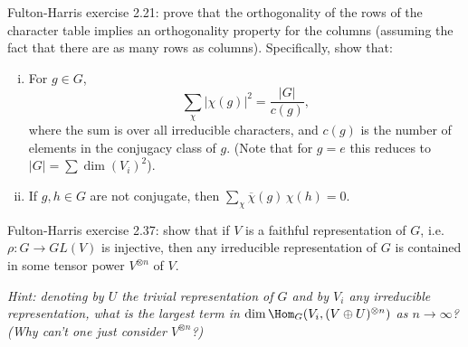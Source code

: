 \documentclass[11pt,letterpaper]{article}
\begin{document}
\pagebreak
\begin{problem}
    Fulton-Harris exercise 2.21: prove that the orthogonality of the rows of the character table implies an orthogonality property for the columns (assuming the fact that there are as many rows as columns).  Specifically, show that:
    \begin{enumerate}[(i)]
        \item For $g\in G$, $$\sum\limits_\chi |\chi(g)|^2=\dfrac{|G|}{c(g)},$$ where the sum is over all irreducible characters, and $c(g)$ is the number of elements in the conjugacy class of $g$. (Note that for $g=e$ this reduces to $|G|=\sum \dim(V_i)^2$).
        \item If $g,h\in G$ are not conjugate, then $\sum\limits_\chi \overline{\chi}(g)\,\chi(h)=0$.
    \end{enumerate}
\end{problem}

\pagebreak
\begin{problem}
    Fulton-Harris exercise 2.37: show that if $V$ is a faithful representation of $G$, i.e.\ $\rho:G\to GL(V)$ is injective, then any irreducible representation of $G$ is contained in some tensor power $V^{\otimes n}$ of $V$.
\end{problem}
\textit{Hint: denoting by $U$ the trivial representation of $G$ and by $V_i$ any irreducible representation, what is the largest term in $\dim \Hom_G(V_i,(V\oplus U)^{\otimes n})$ as $n\to \infty$? (Why can't one just consider $V^{\otimes n}$?)}
\end{document}
